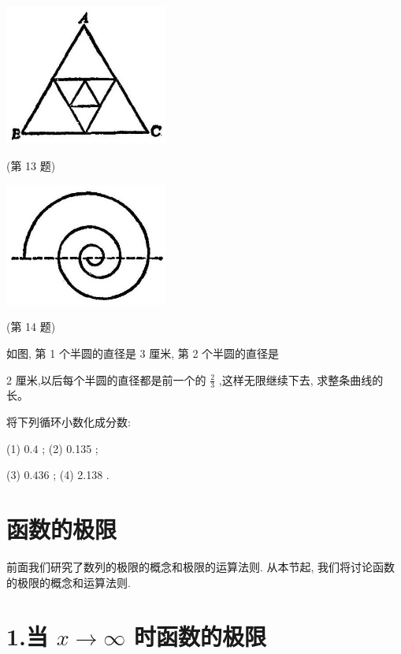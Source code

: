 \documentclass[lang=cn,newtx,10pt,scheme=chinese]{elegantbook}
\begin{document}
\begin{problemset}[习题一]
	\begin{center}
		\includegraphics[max width=0.4\textwidth]{images/01912c18-5c3f-733d-b775-749ba9897a9d_20_529798.jpg}
	\end{center}
	
	(第 13 题)
	
	\begin{center}
		\includegraphics[max width=0.4\textwidth]{images/01912c18-5c3f-733d-b775-749ba9897a9d_20_500122.jpg}
	\end{center}
	
	(第 14 题)
	
	\item 如图, 第 1 个半圆的直径是 3 厘米, 第 2 个半圆的直径是
	
	2 厘米,以后每个半圆的直径都是前一个的 \(\frac{2}{3}\) ,这样无限继续下去, 求整条曲线的长。
	
	\item 将下列循环小数化成分数:
	
	(1) \({0.4}\) ; (2) 0.135 ;
	
	(3) \({0.436}\) ; (4) 2.138 .
	
\end{problemset}

\section{函数的极限}
前面我们研究了数列的极限的概念和极限的运算法则. 从本节起, 我们将讨论函数的极限的概念和运算法则.

\section*{1.当 \(x \rightarrow \infty\) 时函数的极限}
\end{document}
